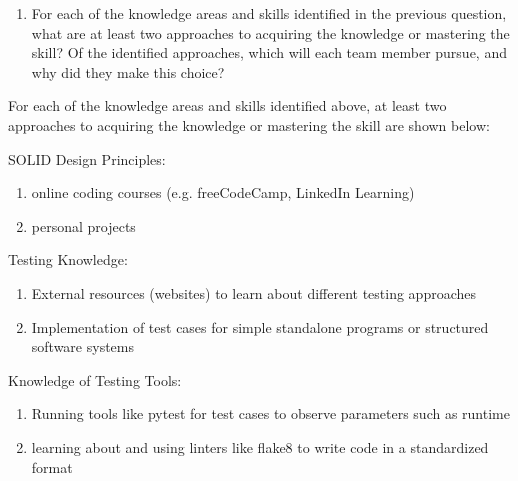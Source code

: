 \documentclass[12pt, titlepage]{article}
\begin{document}
\begin{enumerate}[label=\arabic*., resume*=ar]
  \item For each of the knowledge areas and skills identified in the previous
  question, what are at least two approaches to acquiring the knowledge or
  mastering the skill?  Of the identified approaches, which will each team
  member pursue, and why did they make this choice? \\
\end{enumerate}

For each of the knowledge areas and skills identified above, at least two approaches to acquiring the knowledge or mastering the skill are shown below:
\begin{enumerate}
    \begin{item}
        SOLID Design Principles:
        \begin{enumerate}
            \item online coding courses (e.g. freeCodeCamp, LinkedIn Learning)
            \item personal projects
        \end{enumerate}
    \end{item}
    \begin{item}
        Testing Knowledge:
        \begin{enumerate}
            \item External resources (websites) to learn about different testing approaches
            \item Implementation of test cases for simple standalone programs or structured software systems
        \end{enumerate}
    \end{item}
    \begin{item}
        Knowledge of Testing Tools:
        \begin{enumerate}
            \item Running tools like pytest for test cases to observe parameters such as runtime
            \item learning about and using linters like flake8 to write code in a standardized format
        \end{enumerate}
    \end{item}
\end{enumerate}
\end{document}

